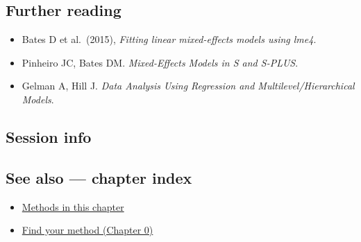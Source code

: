 \documentclass[
]{article}
\newenvironment{Shaded}{\begin{snugshade}}{\end{snugshade}}
\providecommand{\tightlist}{%
  \setlength{\itemsep}{0pt}\setlength{\parskip}{0pt}}
\begin{document}
\subsection{Further reading}\label{further-reading}

\begin{itemize}
\tightlist
\item
  Bates D et al.~(2015), \emph{Fitting linear mixed-effects models using
  lme4}.
\item
  Pinheiro JC, Bates DM. \emph{Mixed-Effects Models in S and S-PLUS}.
\item
  Gelman A, Hill J. \emph{Data Analysis Using Regression and
  Multilevel/Hierarchical Models}.
\end{itemize}

\subsection{Session info}\label{session-info}

\begin{Shaded}
\begin{Highlighting}[]

\end{Highlighting}
\end{Shaded}

\subsection{See also --- chapter index}\label{see-also-chapter-index}

\begin{itemize}
\tightlist
\item
  \href{../index.Rmd}{Methods in this chapter}
\item
  \href{../../../ch00-find-your-method.Rmd}{Find your method (Chapter
  0)}
\end{itemize}
\end{document}
